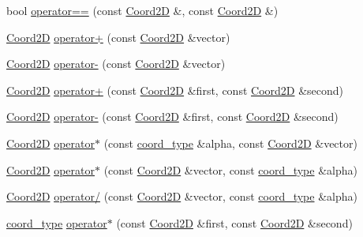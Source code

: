 \begin{DoxyCompactItemize}
\item 
bool \hyperlink{namespaceMcCAD_1_1Geometry_a742210290c3e0feb0e768ffcd52ea18a}{operator==} (const \hyperlink{classMcCAD_1_1Geometry_1_1Coord2D}{Coord2D} \&, const \hyperlink{classMcCAD_1_1Geometry_1_1Coord2D}{Coord2D} \&)
\item 
\hyperlink{classMcCAD_1_1Geometry_1_1Coord2D}{Coord2D} \hyperlink{namespaceMcCAD_1_1Geometry_a1ce4043235fd21f1db10d3ef3bee7490}{operator+} (const \hyperlink{classMcCAD_1_1Geometry_1_1Coord2D}{Coord2D} \&vector)
\item 
\hyperlink{classMcCAD_1_1Geometry_1_1Coord2D}{Coord2D} \hyperlink{namespaceMcCAD_1_1Geometry_abf685bcca6c6c30474088f9265881d54}{operator-\/} (const \hyperlink{classMcCAD_1_1Geometry_1_1Coord2D}{Coord2D} \&vector)
\item 
\hyperlink{classMcCAD_1_1Geometry_1_1Coord2D}{Coord2D} \hyperlink{namespaceMcCAD_1_1Geometry_a737436e759da80cfaca4cc9ab0daa44d}{operator+} (const \hyperlink{classMcCAD_1_1Geometry_1_1Coord2D}{Coord2D} \&first, const \hyperlink{classMcCAD_1_1Geometry_1_1Coord2D}{Coord2D} \&second)
\item 
\hyperlink{classMcCAD_1_1Geometry_1_1Coord2D}{Coord2D} \hyperlink{namespaceMcCAD_1_1Geometry_a9f5f8f35d8efc74fdc86e06920f09194}{operator-\/} (const \hyperlink{classMcCAD_1_1Geometry_1_1Coord2D}{Coord2D} \&first, const \hyperlink{classMcCAD_1_1Geometry_1_1Coord2D}{Coord2D} \&second)
\item 
\hyperlink{classMcCAD_1_1Geometry_1_1Coord2D}{Coord2D} \hyperlink{namespaceMcCAD_1_1Geometry_ab8737820743399743f2fb6adda1a8548}{operator$\ast$} (const \hyperlink{namespaceMcCAD_1_1Geometry_ac043b37a4a7e849fca22869e1982d2f8}{coord\+\_\+type} \&alpha, const \hyperlink{classMcCAD_1_1Geometry_1_1Coord2D}{Coord2D} \&vector)
\item 
\hyperlink{classMcCAD_1_1Geometry_1_1Coord2D}{Coord2D} \hyperlink{namespaceMcCAD_1_1Geometry_a48d796599e371b20b47694baf2e9f14f}{operator$\ast$} (const \hyperlink{classMcCAD_1_1Geometry_1_1Coord2D}{Coord2D} \&vector, const \hyperlink{namespaceMcCAD_1_1Geometry_ac043b37a4a7e849fca22869e1982d2f8}{coord\+\_\+type} \&alpha)
\item 
\hyperlink{classMcCAD_1_1Geometry_1_1Coord2D}{Coord2D} \hyperlink{namespaceMcCAD_1_1Geometry_a28cd2cc1d0220de2e29ea0439e6dee22}{operator/} (const \hyperlink{classMcCAD_1_1Geometry_1_1Coord2D}{Coord2D} \&vector, const \hyperlink{namespaceMcCAD_1_1Geometry_ac043b37a4a7e849fca22869e1982d2f8}{coord\+\_\+type} \&alpha)
\item 
\hyperlink{namespaceMcCAD_1_1Geometry_ac043b37a4a7e849fca22869e1982d2f8}{coord\+\_\+type} \hyperlink{namespaceMcCAD_1_1Geometry_af732040158a40b445fdc178d216186b3}{operator$\ast$} (const \hyperlink{classMcCAD_1_1Geometry_1_1Coord2D}{Coord2D} \&first, const \hyperlink{classMcCAD_1_1Geometry_1_1Coord2D}{Coord2D} \&second)

\end{DoxyCompactItemize}
